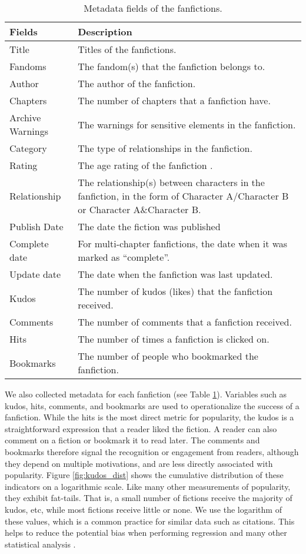 \documentclass[letterpaper]{article} %
\begin{document}
\begin{table}
\centering
\begin{tabular}[width=\textwidth]{p{3cm}p{5cm}}
\toprule
Fields & Description \\ 
   \hline			
Title & Titles of the fanfictions.  \\
Fandoms & The fandom(s) that the fanfiction belongs to. \\
Author & The author of the fanfiction.  \\
Chapters & The number of chapters that a fanfiction have. \\
Archive Warnings & The warnings for sensitive elements in the fanfiction. \\
Category & The type of relationships in the fanfiction. \\
Rating & The age rating of the fanfiction . \\
Relationship & The relationship(s) between characters in the fanfiction, in the form of Character A/Character B
or Character A\&Character B. \\
Publish Date & The date the fiction was published \\
Complete date & For multi-chapter fanfictions, the date when it was marked as ``complete''.\\
Update date & The date when the fanfiction was last updated. \\
\hline
Kudos & The number of kudos (likes) that the fanfiction received. \\
Comments & The number of comments that a fanfiction received.\\
Hits & The number of times a fanfiction is clicked on. \\
Bookmarks & The number of people who bookmarked the fanfiction.\\

\bottomrule
\end{tabular}
\caption{Metadata fields of the fanfictions.}
\label{tab:metadata}
\end{table}%

We also collected metadata for each fanfiction (see Table \ref{tab:metadata}). Variables such as kudos, hits, comments, and bookmarks are used to operationalize the success of a fanfiction. While the hits is the most direct metric for popularity, the kudos is a straightforward expression that a reader liked the fiction. A reader can also comment on a fiction or bookmark it to read later. The comments and bookmarks therefore signal the recognition or engagement from readers, although they depend on multiple motivations, and are less directly associated with popularity. Figure \ref{fig:kudos_dist} shows the cumulative distribution of these indicators on a logarithmic scale. Like many other measurements of popularity, they exhibit fat-tails. That is, a small number of fictions receive the majority of kudos, etc, while most fictions receive little or none. We use the logarithm of these values, which is a common practice for similar data such as citations. This helps to reduce the potential bias when performing regression and many other statistical analysis \cite{thelwall2014regression}. 
\end{document}
